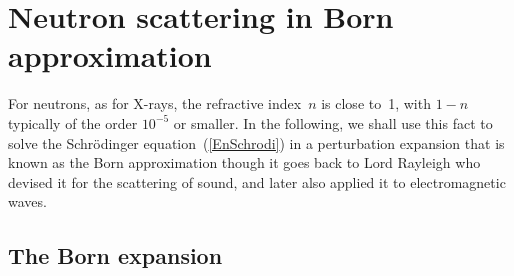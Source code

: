 
\section{Neutron scattering in Born approximation}

For neutrons, as for X-rays, the refractive index~$n$ is close to~1,
with $1-n$ typically of the order $10^{-5}$ or smaller.
In the following,
we shall use this fact to solve the Schrödinger equation~(\ref{EnSchrodi})
in a perturbation expansion
that is known as the Born approximation
though it goes back to Lord Rayleigh
who devised it for the scattering of sound,
and later also applied it to electromagnetic waves.

\subsection{The Born expansion}\label{SBorn}


